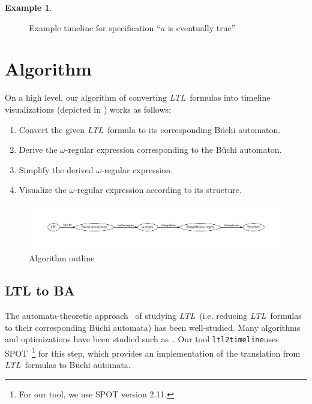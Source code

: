 \documentclass[conference]{IEEEtran}
\theoremstyle{definition}
\newtheorem{example}{Example}[section]
\theoremstyle{remark}
\newcommand{\ltl}{\textit{LTL}}
\newcommand{\Buchi}{B\"{u}chi }
\newcommand{\tool}{\hspace{0.1cm}\texttt{ltl2timeline}}
\begin{document}
\begin{example}
\begin{figure}[!h]
        \caption{Example timeline for specification ``$a$ is eventually true''}
        \label{fig:ex15}
    \end{figure}
\end{example}

\section{Algorithm}
On a high level, our algorithm of converting \ltl\ formulas into timeline visualizations (depicted in ) works as follows:
\begin{enumerate}
    \item Convert the given \ltl\ formula to its corresponding \Buchi automaton. %
    \item Derive the $\omega$-regular expression corresponding to the \Buchi automaton. %
    \item Simplify the derived $\omega$-regular expression. %
    \item Visualize the $\omega$-regular expression according to its structure. %
\end{enumerate}
\begin{figure}[!t]
    \centering
    \includegraphics[width=\textwidth, scale=0.3]{img/algorithm_outline.pdf}
    \caption{Algorithm outline}
    \label{fig:algo}
\end{figure}

\subsection{LTL to BA} \label{ltl2aut}
The automata-theoretic approach~\cite{ORBi-a8d60ab6-1101-4434-9511-c01ea4e5a15b} of studying \ltl\ (i.e. reducing \ltl\ formulas to their corresponding \Buchi automata) has been well-studied. Many algorithms and optimizations have been studied such as~\cite{DGV99, F03}. Our tool \tool uses SPOT~\cite{Dur22}\footnote{For our tool, we use SPOT version 2.11.} for this step, which provides an implementation of the translation from \ltl\ formulas to \Buchi automata.
\end{document}

